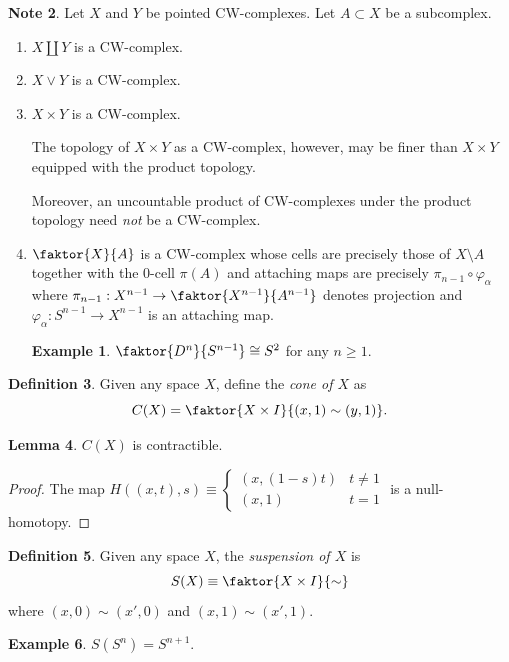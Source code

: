\documentclass[10pt,letterpaper,cm]{nupset}
\theoremstyle{definition}
\newtheorem{definition}{Definition}[subsection]
\newtheorem{exmp}[definition]{Example}
\newtheorem{note}[definition]{Note}
\theoremstyle{theorem}
\newtheorem{lemma}[definition]{Lemma}
\theoremstyle{remark}
\newcommand{\1}{\mathbb{1}}
\newcommand{\0}{\vec 0}
\begin{document}
\begin{note} Let $X$ and $Y$ be pointed CW-complexes. Let $A\subset X$ be a subcomplex.
\begin{enumerate}
\item $X\coprod Y$ is a CW-complex.
\item $X \vee Y$ is a CW-complex.
\item $X\times Y$ is a CW-complex.

 The topology of $X \times Y$ as a CW-complex, however, may be finer than $X\times Y$ equipped with the product topology. 

Moreover, an uncountable product of CW-complexes under the product topology need \emph{not} be a CW-complex.


\item $\faktor{X}{A}$ is a CW-complex whose cells are precisely those of $X\setminus A$ together with the $0$-cell $\pi(A)$ and attaching maps are precisely $\pi_{n-1} \circ \varphi_{\alpha}$ where $\pi_{n-1} : X^{n-1} \to \faktor{X^{n-1}}{A^{n-1}}$ denotes projection and $\varphi_{\alpha} :S^{n-1} \to X^{n-1}$ is an attaching map. 
\begin{exmp}
$\faktor{D^n}{S^{n-1}} \cong S^2$ for any $n\geq 1$.
\end{exmp}
\end{enumerate}
\end{note}

\begin{definition}
Given any space $X$, define the \textit{cone of $X$} as $$C(X) = \faktor{X\times I}{(x,1) \sim (y,1)}.   $$
\end{definition}
\begin{lemma}
$C(X)$ is contractible.
\end{lemma}
\begin{proof}
The map $H((x,t), s) \equiv \begin{cases} \left(x, (1-s)t\right) & t\ne 1 \\ (x,1) & t=1
\end{cases}$ is a null-homotopy.
\end{proof}

\begin{definition}
Given any space $X$, the \textit{suspension of $X$} is $$S(X) \equiv\faktor{X\times I}{\sim}$$ where $\left(x,0\right) \sim \left(x', 0\right)$ and $\left(x,1\right) \sim \left(x', 1\right)$. 
\end{definition}
\begin{exmp}
$S(S^n) = S^{n+1}.$
\end{exmp}
\end{document}
